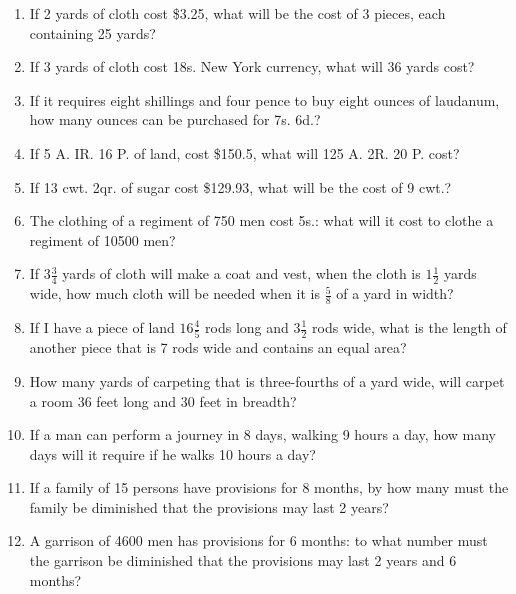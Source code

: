 \documentclass[12pt]{article}
\begin{document}
\begin{enumerate}
\item If 2 yards of cloth cost \$3.25, what will be the cost of 3 pieces, each containing 25 yards? 
\spacing

\item If 3 yards of cloth cost 18s. New York currency, what will 36 yards cost? 
\spacing

\item If it requires eight shillings and four pence to buy eight ounces of laudanum, how many ounces can be purchased for 7s. 6d.? 
\spacing

\item If 5 A. IR. 16 P. of land, cost \$150.5, what will 125 A. 2R. 20 P. cost? 
\spacing

\item If 13 cwt. 2qr. of sugar cost \$129.93, what will be the cost of 9 cwt.? 
\spacing

\item The clothing of a regiment of 750 men cost  5s.: what will it cost to clothe a regiment of 10500 men? 
\spacing

\item If $3\frac{3}{4}$ yards of cloth will make a coat and vest, when the cloth is $1\frac{1}{2}$ yards wide, how much cloth will be needed when it is $\frac{5}{8}$ of a yard in width? 
\spacing

\item If I have a piece of land $16\frac{4}{5}$ rods long and $3\frac{1}{2}$ rods wide, what is the length of another piece that is 7 rods wide and contains an equal area? 
\spacing

\item How many yards of carpeting that is three-fourths of a yard wide, will carpet a room 36 feet long and 30 feet in breadth? 
\spacing

\item If a man can perform a journey in 8 days, walking 9 hours a day, how many days will it require if he walks 10 hours a day? 
\spacing

\item If a family of 15 persons have provisions for 8 months, by how many must the family be diminished that the provisions may last 2 years? 
\spacing

\item A garrison of 4600 men has provisions for 6 months: to what number must the garrison be diminished that the provisions may last 2 years and 6 months? 
\spacing


\end{enumerate}
\end{document}
